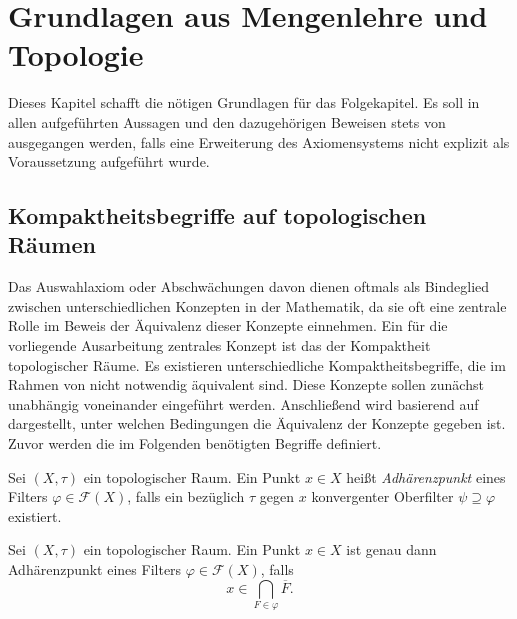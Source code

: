 \chapter{Grundlagen aus Mengenlehre und Topologie}

Dieses Kapitel schafft die nötigen Grundlagen für das Folgekapitel.
Es soll in allen aufgeführten Aussagen und den dazugehörigen Beweisen stets von \ZF ausgegangen werden, falls eine Erweiterung des Axiomensystems nicht explizit als Voraussetzung aufgeführt wurde.

\section{Kompaktheitsbegriffe auf topologischen Räumen}

Das Auswahlaxiom oder Abschwächungen davon dienen oftmals als Bindeglied zwischen unterschiedlichen Konzepten in der Mathematik, da sie oft eine zentrale Rolle im Beweis der Äquivalenz dieser Konzepte einnehmen. 
Ein für die vorliegende Ausarbeitung zentrales Konzept ist das der Kompaktheit topologischer Räume. 
Es existieren unterschiedliche Kompaktheitsbegriffe, die im Rahmen von \ZF nicht notwendig äquivalent sind.
Diese Konzepte sollen zunächst unabhängig voneinander eingeführt werden. 
Anschließend wird basierend auf \cite{herrlich2006axiom} dargestellt, unter welchen Bedingungen die Äquivalenz der Konzepte gegeben ist.
Zuvor werden die im Folgenden benötigten Begriffe definiert. 

\begin{defn}
  Sei $(X,\tau)$ ein topologischer Raum.
  Ein Punkt $x \in X$ heißt \textit{Adhärenzpunkt} eines Filters $\varphi \in \mathcal{F}(X)$, falls ein bezüglich $\tau$ gegen $x$ konvergenter Oberfilter $\psi \supseteq \varphi$ existiert.
\end{defn}

\begin{prop}
  \label{prop:adherence}
  Sei $(X,\tau)$ ein topologischer Raum.
  Ein Punkt $x \in X$ ist genau dann Adhärenzpunkt eines Filters $\varphi \in \mathcal{F}(X)$, falls
  \begin{displaymath}
    x \in \bigcap_{F \in \varphi} \overline{F}.
  \end{displaymath}
\end{prop}

